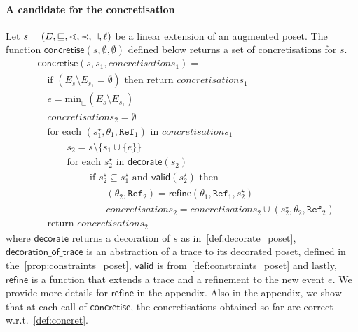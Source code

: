 \paragraph{A candidate for the concretisation}
Let $s = (E,\sqsubseteq,\lessdot,\prec,\dashv,\ell)$ be a linear extension of an augmented poset. The function $\mathsf{concretise}(s,\emptyset,\emptyset)$ defined below returns a set of concretisations for $s$.
\begin{align*}
  &\mathsf{concretise}(s,s_1,\mathit{concretisations}_1) = \\
  &\quad\text{if }(E_s\setminus E_{s_1} = \emptyset)\text{ then return }\mathit{concretisations}_1\\
  &\quad e = \text{min}_{\sqsubset}(E_s\setminus E_{s_1})\\
  &\quad\mathit{concretisations}_2 = \emptyset \\
  &\quad\text{for each }(s_1^{\star},\theta_1,\mathtt{Ref}_1)\text{ in }\mathit{concretisations}_1\\
  &\quad\qquad s_2 = s\setminus\{s_1\cup\{e\}\}\\
  &\quad\qquad\text{for each }s_2^{\star}\text{ in }\mathsf{decorate}(s_2)\\
  &\quad\qquad\qquad \text{ if }s_2^{\star}\subseteq s_1^{\star}\text{ and }\mathsf{valid}(s_2^{\star})\text{ then }\\
  &\quad\qquad\qquad\qquad (\mathit{\theta_2},\mathtt{Ref}_2) = \mathsf{refine}(\theta_1,\mathtt{Ref}_1,s_2^{\star})\\
  &\quad\qquad\qquad\qquad \mathit{concretisations}_2 = \mathit{concretisations}_2 \cup (s_2^{\star},\mathit{\theta_2},\mathtt{Ref}_2)\\
  &\quad\text{return }\mathit{concretisations}_2
\end{align*}
where $\mathsf{decorate}$ returns a decoration of $s$ as in~\autoref{def:decorate_poset}, $\mathsf{decoration\_of\_trace}$ is an abstraction of a trace to its decorated poset, defined in the~\autoref{prop:constraints_poset}, $\mathsf{valid}$ is from~\autoref{def:constraints_poset} and lastly, $\mathsf{refine}$ is a function that extends a trace and a refinement to the new event $e$. We provide more details for $\mathsf{refine}$ in the appendix. Also in the appendix, we show that at each call of $\mathsf{concretise}$, the concretisations obtained so far are correct w.r.t.~\autoref{def:concret}.


